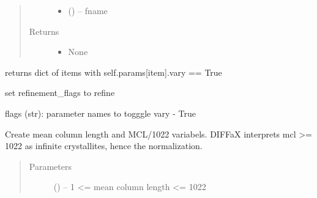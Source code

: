 \documentclass[letterpaper,10pt,english]{sphinxmanual}
\begin{document}
\begin{fulllineitems}
\begin{fulllineitems}
\begin{quote}
\begin{description}
\begin{itemize}
\item {} 
 (\sphinxstyleliteralemphasis{*}) -- fname

\end{itemize}

\item[{Returns}] \leavevmode
\begin{itemize}
\item {} 
None

\end{itemize}


\end{description}\end{quote}

\end{fulllineitems}


\begin{fulllineitems}
\label{\detokenize{rst/structure:mstack.structure.Phase.report_refined}}
returns dict of items with self.params{[}item{]}.vary == True

\end{fulllineitems}


\begin{fulllineitems}
\label{\detokenize{rst/structure:mstack.structure.Phase.toggle}}
set refinement\_flags to refine

flags (str): parameter names to togggle vary - True

\end{fulllineitems}


\begin{fulllineitems}
\label{\detokenize{rst/structure:mstack.structure.Phase.update_mcl}}
Create mean column length and MCL/1022 variabels. DIFFaX interprets
mcl \textgreater{}= 1022 as infinite crystallites, hence the normalization.
\begin{quote}\begin{description}
\item[{Parameters}] \leavevmode
{} (\sphinxstyleliteralemphasis{*}) -- 1 \textless{}= mean column length \textless{}= 1022


\end{description}
\end{quote}
\end{fulllineitems}
\end{fulllineitems}
\end{document}
